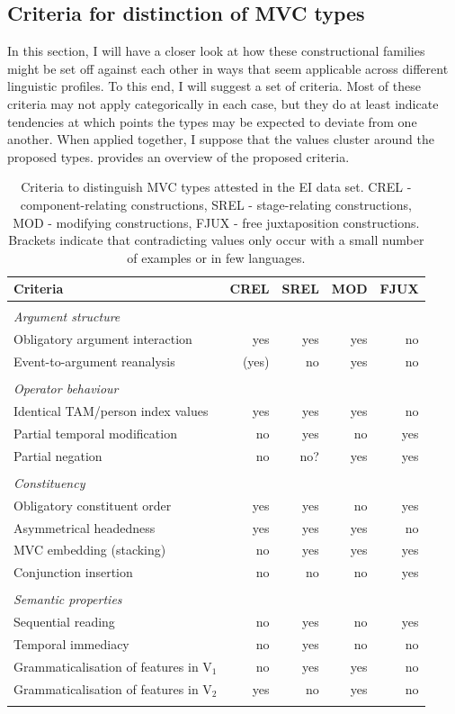 \subsection{Criteria for distinction of MVC types}\label{sec:criteria_mvcs}

In this section, I will have a closer look at how these constructional families might be set off against each other in ways that seem applicable across different linguistic profiles. To this end, I will suggest a set of criteria. Most of these criteria may not apply categorically in each case, but they do at least indicate tendencies at which points the types may be expected to deviate from one another. When applied together, I suppose that the values cluster around the proposed types.  provides an overview of the proposed criteria.

\begin{table}
\begin{tabular}{lrrrr}
\lsptoprule
Criteria&CREL&SREL&MOD&FJUX\tabularnewline
\midrule
\tabularnewline
\textit{Argument structure}& & & & \tabularnewline
Obligatory argument interaction&yes&yes&yes&no\tabularnewline
Event-to-argument reanalysis&(yes)&no&yes&no\tabularnewline\tabularnewline
\textit{Operator behaviour}& & & & \tabularnewline
Identical TAM/person index values&yes&yes&yes&no\tabularnewline
Partial temporal modification&no&yes&no&yes\tabularnewline
Partial negation&no&no?&yes&yes\tabularnewline\tabularnewline
\textit{Constituency}& & & & \tabularnewline
Obligatory constituent order&yes&yes&no&yes\tabularnewline
Asymmetrical headedness&yes&yes&yes&no\tabularnewline
MVC embedding (stacking)&no&yes&yes&yes\tabularnewline
Conjunction insertion&no&no&no&yes\tabularnewline\tabularnewline
\textit{Semantic properties}& & & & \tabularnewline
Sequential reading&no&yes&no&yes\tabularnewline
Temporal immediacy&no&yes&no&no\tabularnewline
Grammaticalisation of features in V$_1$&no&yes&yes&no\tabularnewline
Grammaticalisation of features in V$_2$&yes&no&yes&no\tabularnewline
\lspbottomrule
\end{tabular}
\caption[Criteria to distinguish MVC types]{Criteria to distinguish MVC types attested in the EI data set. CREL - component-relating constructions, SREL - stage-relating constructions, MOD - modifying constructions, FJUX - free juxtaposition constructions. Brackets indicate that contradicting values only occur with a small number of examples or in few languages.}
\label{table:criteriaconstruction}
\end{table}

